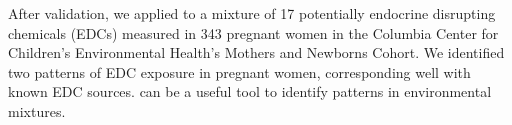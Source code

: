 {After validation, we applied \bnmf to a mixture of 17 potentially endocrine disrupting chemicals (EDCs) measured in 343 pregnant women in the Columbia Center for Children’s Environmental Health's Mothers and Newborns Cohort.  We identified two patterns of EDC exposure in pregnant women, corresponding well with known EDC sources. \bnmf can be a useful tool to identify patterns in environmental mixtures.
} %

